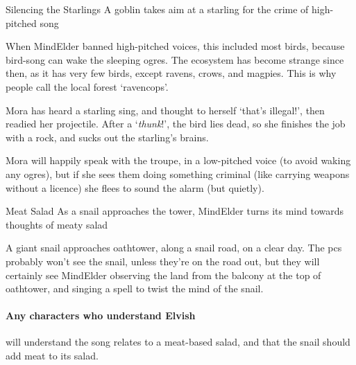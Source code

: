 {Silencing the Starlings}%
{A goblin takes aim at a starling for the crime of high-pitched song}%


\begin{exampletext}
  When \gls{MindElder} banned high-pitched voices, this included most birds, because bird-song can wake the sleeping ogres.
  The ecosystem has become strange since then, as it has very few birds, except ravens, crows, and magpies.
  This is why people call the local forest `\gls{ravencops}'.
\end{exampletext}

Mora has heard a starling sing, and thought to herself `that's illegal!', then readied her \gls{projectile}.
After a `\emph{thunk}!', the bird lies dead, so she finishes the job with a rock, and sucks out the starling's brains.

Mora will happily speak with the troupe, in a low-pitched voice (to avoid waking any \glspl{ogre}), but if she sees them doing something criminal (like carrying weapons without a licence) she flees to sound the alarm (but quietly).


{Meat Salad}%
{As a snail approaches the tower, \gls{MindElder} turns its mind towards thoughts of meaty salad}%


A giant snail approaches \gls{oathtower}, along a snail road, on a clear day.
The \glspl{pc} probably won't see the snail, unless they're on the road out, but they will certainly see \gls{MindElder} observing the land from the balcony at the top of \gls{oathtower}, and singing a spell to twist the mind of the snail.

\paragraph{Any characters who understand Elvish}
will understand the song relates to a meat-based salad, and that the snail should add meat to its salad.

